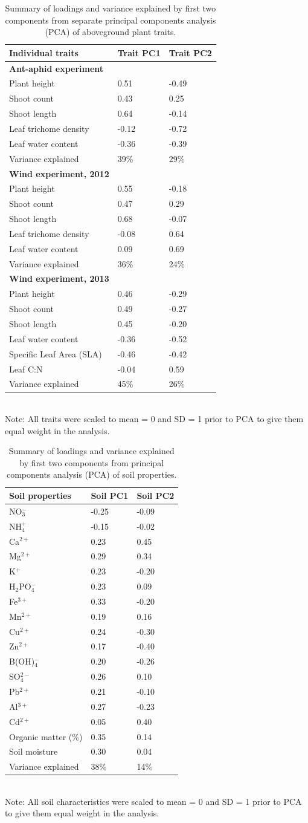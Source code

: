 \documentclass[11pt]{article}
\begin{document}
\begin{table}[]
\centering
\caption{Summary of loadings and variance explained by first
two components from separate principal components analysis (PCA) of
aboveground plant traits.}
\label{traitPCA}
\begin{tabular}{@{}lll@{}}
\toprule
Individual traits & Trait PC1 & Trait
PC2\tabularnewline
\midrule
\textbf{Ant-aphid experiment} & &\tabularnewline
Plant height & 0.51 & -0.49\tabularnewline
Shoot count & 0.43 & 0.25\tabularnewline
Shoot length & 0.64 & -0.14\tabularnewline
Leaf trichome density & -0.12 & -0.72\tabularnewline
Leaf water content & -0.36 & -0.39\tabularnewline
Variance explained & 39\% & 29\% \\ %
\textbf{Wind experiment, 2012} & &\tabularnewline
Plant height & 0.55 & -0.18\tabularnewline
Shoot count & 0.47 & 0.29\tabularnewline
Shoot length & 0.68 & -0.07\tabularnewline
Leaf trichome density & -0.08 & 0.64\tabularnewline
Leaf water content & 0.09 & 0.69\tabularnewline
Variance explained & 36\% & 24\% \\ %
\textbf{Wind experiment, 2013} & &\tabularnewline
Plant height & 0.46 & -0.29\tabularnewline
Shoot count & 0.49 & -0.27\tabularnewline
Shoot length & 0.45 & -0.20\tabularnewline
Leaf water content & -0.36 & -0.52\tabularnewline
Specific Leaf Area (SLA) & -0.46 & -0.42\tabularnewline
Leaf C:N & -0.04 & 0.59\tabularnewline
Variance explained & 45\% & 26\%\tabularnewline
\bottomrule
\end{tabular}
\bigskip{}
\\
{\footnotesize Note: All traits were scaled to mean = 0 and SD = 1
prior to PCA to give them equal weight in the analysis.}
\end{table}

\begin{table} %
\centering
\caption{Summary of loadings and variance explained by first
two components from principal components analysis (PCA) of soil
properties.}
\label{soilPCA}
\begin{tabular}{@{}lll@{}}
\toprule
Soil properties & Soil PC1 & Soil
PC2\tabularnewline
\midrule
NO$_3^-$ & -0.25 & -0.09\tabularnewline
NH$_4^+$ & -0.15 & -0.02\tabularnewline
Ca$^{2+}$ & 0.23 & 0.45\tabularnewline
Mg$^{2+}$ & 0.29 & 0.34\tabularnewline
K$^+$ & 0.23 & -0.20\tabularnewline
H$_2$PO$_4^-$ & 0.23 & 0.09\tabularnewline
Fe$^{3+}$ & 0.33 & -0.20\tabularnewline
Mn$^{2+}$ & 0.19 & 0.16\tabularnewline
Cu$^{2+}$ & 0.24 & -0.30\tabularnewline
Zn$^{2+}$ & 0.17 & -0.40\tabularnewline
B(OH)$_4^-$ & 0.20 & -0.26\tabularnewline
SO$_4^{2-}$ & 0.26 & 0.10\tabularnewline
Pb$^{2+}$ & 0.21 & -0.10\tabularnewline
Al$^{3+}$ & 0.27 & -0.23\tabularnewline
Cd$^{2+}$ & 0.05 & 0.40\tabularnewline
Organic matter (\%) & 0.35 & 0.14\tabularnewline
Soil moisture & 0.30 & 0.04\tabularnewline
Variance explained & 38\% & 14\%\tabularnewline
\bottomrule
\end{tabular}
\bigskip{}
\\
{\footnotesize Note: All soil characteristics were scaled to mean = 0 and SD = 1
prior to PCA to give them equal weight in the analysis.}
\end{table}
\end{document}
